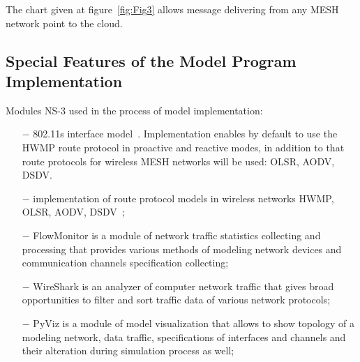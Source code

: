 \documentclass[a4paper,twoside]{article}
\begin{document}
\begin{figure}[!h]
  \vspace{-0.2cm}
  \vspace{-0.1cm}
\end{figure}


\begin{figure}[!ht]
  \vspace{-0.2cm}
  \vspace{-0.1cm}
\end{figure}

The chart given at figure~\ref{fig:Fig3} allows message delivering from any MESH network point to the cloud.

\subsection{Special Features of the Model Program Implementation}

Modules NS-3 used in the process of model implementation:
\begin{itemize}
\item[$-$] 802.11s interface model~\cite{Andreev}. Implementation enables by default to use the HWMP route protocol in proactive and reactive modes, in addition to that route protocols for wireless MESH networks will be used: OLSR, AODV, DSDV.

\item[$-$] implementation of route protocol models in wireless networks HWMP, OLSR, AODV, DSDV~\cite{Narra:2011:DDV:2151054.2151132};

\item[$-$] FlowMonitor is a module of network traffic statistics collecting and processing that provides various methods of modeling network devices and communication channels specification collecting;

\item[$-$] WireShark is an analyzer of computer network traffic that gives broad opportunities to filter and sort traffic data of various network protocols;

\item[$-$] PyViz is a module of model visualization that allows to show topology of a modeling network, data traffic, specifications of interfaces and channels and their alteration during simulation process as well;
\end{itemize}
\end{document}
